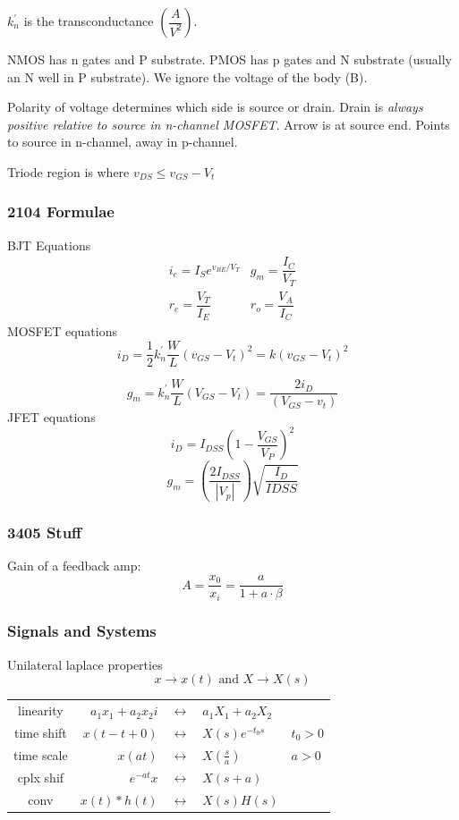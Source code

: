 \documentclass[a4paper,12pt]{article}
\begin{document}
\begin{multicols}{2}
$k^\prime_n$ is the transconductance $\left(\dfrac{A}{V^2}\right)$.

NMOS has n gates and P substrate. PMOS has p gates and N substrate (usually an
N well in P substrate). We ignore the voltage of the body (B).

Polarity of voltage determines which side is source or drain. Drain is
\emph{always positive relative to source in n-channel MOSFET}. Arrow is at
source end. Points to source in n-channel, away in p-channel.

Triode region is where $v_{DS} \le v_{GS} - V_t$

\subsubsection*{2104 Formulae}
BJT Equations
\[
\begin{array}{cc}
i_c = I_S e^{v_{BE}/V_T}    & g_m = \dfrac{I_C}{V_T}\\
r_e = \dfrac{V_T}{I_E}       &r_o = \dfrac{V_A}{I_C}
\end{array}
\]
MOSFET equations
\[ i_D = \frac{1}{2} k_n^\prime \frac{W}{L}(v_{GS} - V_t)^2 = k(v_{GS} -
V_t)^2\]

\[g_m = k_n^\prime \frac{W}{L} (V_{GS} - V_t) = \frac{2i_D}{(V_{GS} - v_t)}\]
JFET equations
\[i_D = I_{DSS} \left(1 - \frac{V_{GS}}{V_P}\right)^2\]
\[g_m = \left(\frac{2I_{DSS}}{|V_p|}\right)\sqrt{\frac{I_D}{I{DSS}}}\]
\subsubsection*{3405 Stuff}
Gain of a feedback amp:
\[ A = \dfrac{x_0}{x_i}=\dfrac{a}{1+a\cdot \beta}\]
\columnbreak
\subsubsection*{Signals and Systems}
Unilateral laplace properties \[x \rightarrow x(t) \mbox{ and } X \rightarrow X(s)\]

\begin{tabular}{crcll}
linearity& $a_1x_1 + a_2x_2i$&$\leftrightarrow $&$a_1X_1+a_2X_2$&\\
time shift& $x(t-t+0) $&$\leftrightarrow $&$X(s)e^{-t_0s}$ & $t_0 > 0$\\
time scale&$x(at)$&$ \leftrightarrow $&$X\left( \frac{s}{a} \right)$ & $a>0$\\
cplx shif& $e^{-at}x $&$\leftrightarrow $&$X(s+a)$&\\
conv& $x(t)*h(t) $&$\leftrightarrow $&$X(s)H(s)$&\\
\end{tabular}


\end{multicols}
\end{document}
